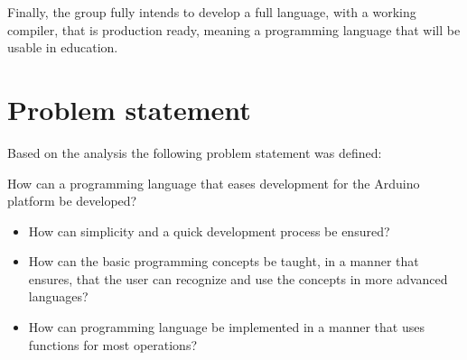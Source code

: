 Finally, the group fully intends to develop a full language, with a working compiler, that is production ready, meaning a programming language that will be usable in education.

\section{Problem statement}
Based on the analysis the following problem statement was defined:
\begin{center}
	How can a programming language that eases development for the Arduino platform be developed?

\begin{itemize}
	\item How can simplicity and a quick development process be ensured? %
	\item How can the basic programming concepts be taught, in a manner that ensures, that the user can recognize and use the concepts in more advanced languages?
	\item How can programming language be implemented in a manner that uses functions for most operations? 
\end{itemize}
\end{center}

 

